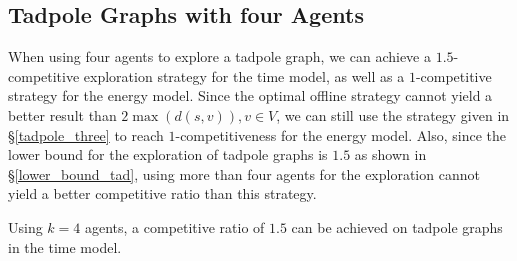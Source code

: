 \subsection{Tadpole Graphs with four Agents}\label{tadpole_four}

When using four agents to explore a tadpole graph, we can achieve a $1.5$-competitive exploration strategy for the time model,
as well as a $1$-competitive strategy for the energy model. Since the optimal offline strategy cannot yield a better result than $2\max(d(s,v)), v\in V$,
we can still use the strategy given in \S\ref{tadpole_three} to reach $1$-competitiveness for the energy model. Also, since the lower bound for the exploration of 
tadpole graphs is $1.5$ as shown in \S\ref{lower_bound_tad}, using more than four agents for the exploration cannot yield a better competitive ratio than this strategy.


\begin{theorem}\label{TadpoleUpperFour}
    Using $k=4$ agents, a competitive ratio of $1.5$ can be achieved on tadpole graphs in the time model.
\end{theorem}


